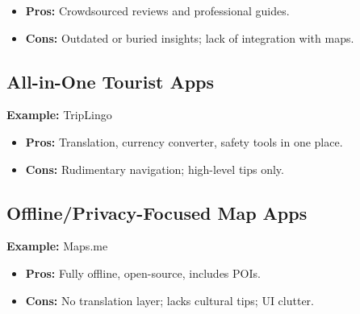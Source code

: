 \begin{itemize}
\item \textbf{Pros:} Crowdsourced reviews and professional guides.
\item \textbf{Cons:} Outdated or buried insights; lack of integration with maps.
\end{itemize}

\subsection{All-in-One Tourist Apps}
\textbf{Example:} TripLingo

\begin{itemize}
\item \textbf{Pros:} Translation, currency converter, safety tools in one place.
\item \textbf{Cons:} Rudimentary navigation; high-level tips only.
\end{itemize}

\subsection{Offline/Privacy-Focused Map Apps}
\textbf{Example:} Maps.me

\begin{itemize}
\item \textbf{Pros:} Fully offline, open-source, includes POIs.
\item \textbf{Cons:} No translation layer; lacks cultural tips; UI clutter.
\end{itemize}



